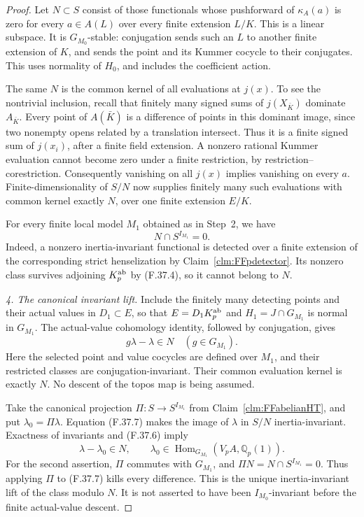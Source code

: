 \documentclass[11pt]{article}
\begin{document}
\begin{proof}
Let \(N\subset S\) consist of those
functionals whose pushforward of
\(\kappa_A(a)\) is zero for every
\(a\in A(L)\) over every finite
extension \(L/K\). This is a linear
subspace. It is \(G_{M_0}\)-stable:
conjugation sends such an \(L\) to
another finite extension of \(K\),
and sends the point and its Kummer
cocycle to their conjugates. This
uses normality of \(H_0\), and
includes the coefficient action.

The same \(N\) is the common kernel
of all evaluations at \(j(x)\).
To see the nontrivial inclusion, recall
that finitely many signed sums of
\(j(X_{\bar K})\) dominate \(A_{\bar K}\).
Every point of \(A(\bar K)\) is a
difference of points in this dominant
image, since two nonempty opens related
by a translation intersect. Thus it
is a finite signed sum of \(j(x_i)\),
after a finite field extension.
A nonzero rational Kummer evaluation
cannot become zero under a finite
restriction, by restriction--corestriction.
Consequently vanishing on all \(j(x)\)
implies vanishing on every \(a\).
Finite-dimensionality of \(S/N\)
now supplies finitely many such
evaluations with common kernel
exactly \(N\), over one finite
extension \(E/K\).

For every finite local model \(M_1\)
obtained as in Step~2, we have
\[
                        N\cap S^{I_{M_1}}=0.
                                                        \tag{F.37.6}
\]
Indeed, a nonzero inertia-invariant
functional is detected over a finite
extension of the corresponding strict
henselization by
Claim~\ref{clm:FFpdetector}. Its
nonzero class survives adjoining
\(K_p^{\rm ab}\) by (F.37.4),
so it cannot belong to \(N\).

\emph{4. The canonical invariant lift.}
Include the finitely many detecting
points and their actual values in
\(D_1\subset E\), so that
\(E=D_1K_p^{\rm ab}\) and
\(H_1=J\cap G_{M_1}\) is normal
in \(G_{M_1}\). The actual-value
cohomology identity, followed by
conjugation, gives
\[
                  g\lambda-\lambda\in N
                         \quad(g\in G_{M_1}).
                                                        \tag{F.37.7}
\]
Here the selected point and value
cocycles are defined over \(M_1\),
and their restricted classes are
conjugation-invariant. Their common
evaluation kernel is exactly \(N\).
No descent of the topos map is
being assumed.

Take the canonical projection
\(\Pi:S\to S^{I_{M_1}}\) from
Claim~\ref{clm:FFabelianHT}, and put
\(\lambda_0=\Pi\lambda\).
Equation (F.37.7) makes the image
of \(\lambda\) in \(S/N\)
inertia-invariant. Exactness of
invariants and (F.37.6) imply
\[
               \lambda-\lambda_0\in N,
           \qquad \lambda_0\in
             \operatorname{Hom}_{G_{M_1}}(V_pA,\mathbb Q_p(1)).
                                                        \tag{F.37.8}
\]
For the second assertion, \(\Pi\)
commutes with \(G_{M_1}\), and
\(\Pi N=N\cap S^{I_{M_1}}=0\).
Thus applying \(\Pi\) to
(F.37.7) kills every difference.
This is the unique inertia-invariant
lift of the class modulo \(N\).
It is not asserted to have been
\(I_{M_0}\)-invariant before the
finite actual-value descent.


\end{proof}
\end{document}
